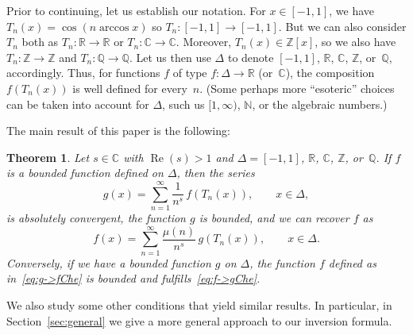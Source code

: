 \documentclass[10pt,a4paper]{amsart}
\theoremstyle{plain}
\newtheorem{theorem}{Theorem}
\theoremstyle{remark}
\newtheorem*{remark}{Remark} %
\renewcommand{\Re}{\operatorname{Re}}
\newcommand{\N}{\mathbb{N}}
\newcommand{\Q}{\mathbb{Q}}
\newcommand{\R}{\mathbb{R}}
\newcommand{\C}{\mathbb{C}}
\newcommand{\Z}{\mathbb{Z}}
\begin{document}
Prior to continuing, let us establish our notation. For $x \in [-1,1]$,
we have $T_n(x) = \cos(n\arccos x)$ so $T_n: [-1,1] \to [-1,1]$.
But we can also consider $T_n$ both as $T_n: \R \to \R$ or $T_n: \C \to \C.$
Moreover, $T_n(x) \in \Z[x]$, so we also have
$T_n: \Z \to \Z$ and $T_n: \Q \to \Q$.
Let us then use $\Delta$ to denote $[-1,1]$, $\R$, $\C$, $\Z$, or~$\Q$, accordingly.
Thus, for functions $f$ of type $f: \Delta \to \R$ (or~$\C$),
the composition $f(T_n(x))$ is well defined for every~$n$.
(Some perhaps more ``esoteric'' choices can be taken into account for $\Delta$,
such us $[1,\infty)$, $\N$, or the algebraic numbers.)

The main result of this paper is the following:

\begin{theorem}
\label{th:f<->gChe}
Let $s \in \C$ with $\Re(s)>1$
and $\Delta = [-1,1]$, $\R$, $\C$, $\Z$, or~$\Q$.
If $f$ is a bounded function defined on $\Delta$, then the series
\begin{equation}
\label{eq:f->gChe}
  g(x) = \sum_{n=1}^\infty \frac{1}{n^s}\, f(T_n(x)), \qquad x \in \Delta,
\end{equation}
is absolutely convergent, the function $g$ is bounded, and we can recover $f$ as
\begin{equation}
\label{eq:g->fChe}
  f(x) = \sum_{n=1}^\infty \frac{\mu(n)}{n^s}\, g(T_n(x)), \qquad x \in \Delta.
\end{equation}
Conversely, if we have a bounded function $g$ on $\Delta$, the function
$f$ defined as in~\eqref{eq:g->fChe} is bounded and fulfills~\eqref{eq:f->gChe}.
\end{theorem}


We also study some other conditions that yield similar results.
In particular, in Section~\ref{sec:general} we give a more general approach to our inversion formula.

\end{document}
